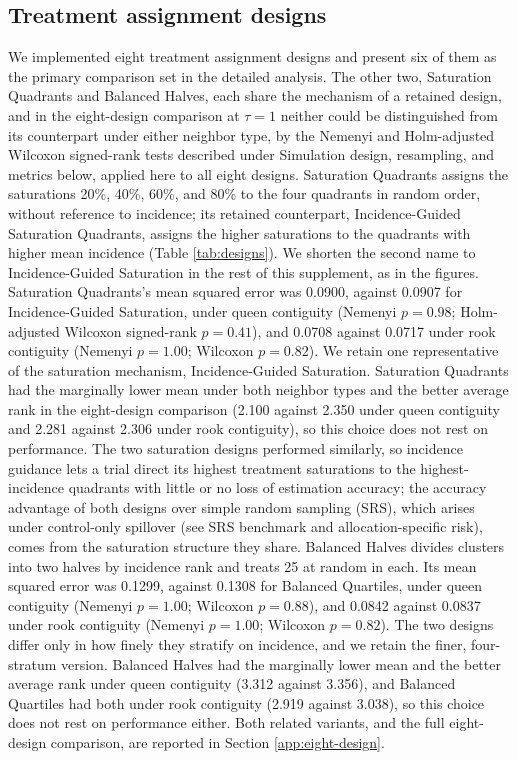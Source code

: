 \documentclass[11pt]{article}
\begin{document}
\subsection{Treatment assignment
designs}\label{treatment-assignment-designs}

We implemented eight treatment assignment designs and present six of
them as the primary comparison set in the detailed analysis. The other two, Saturation Quadrants and Balanced Halves, each share the mechanism
of a retained design, and in the eight-design comparison at \(\tau = 1\)
neither could be distinguished from its counterpart under either
neighbor type, by the Nemenyi and Holm-adjusted Wilcoxon signed-rank
tests described under Simulation design, resampling, and metrics below,
applied here to all eight designs. Saturation Quadrants assigns the saturations 20\%, 40\%, 60\%, and 80\% to the four quadrants in random order, without reference to incidence; its retained counterpart, Incidence-Guided Saturation Quadrants, assigns the higher saturations to the quadrants with higher mean incidence (Table \ref{tab:designs}). We shorten the second name to Incidence-Guided Saturation in the rest of this supplement, as in the figures. Saturation Quadrants's mean squared error was 0.0900, against 0.0907 for Incidence-Guided Saturation, under
queen contiguity (Nemenyi \(p = 0.98\); Holm-adjusted Wilcoxon
signed-rank \(p = 0.41\)), and 0.0708 against 0.0717 under rook
contiguity (Nemenyi \(p = 1.00\); Wilcoxon \(p = 0.82\)). We retain one
representative of the saturation mechanism, Incidence-Guided Saturation. Saturation Quadrants had the marginally lower mean under both
neighbor types and the better average rank in the eight-design
comparison (2.100 against 2.350 under queen contiguity and 2.281 against
2.306 under rook contiguity), so this choice does not rest on performance. The two saturation designs performed similarly, so incidence guidance lets a trial direct its highest treatment saturations to the highest-incidence quadrants with little or no loss of estimation accuracy; the accuracy advantage of both designs over simple random sampling (SRS), which arises under control-only spillover (see SRS benchmark and allocation-specific risk), comes from the saturation structure they share.
Balanced Halves divides clusters into two halves by incidence rank and
treats 25 at random in each. Its mean squared error was 0.1299, against
0.1308 for Balanced Quartiles, under queen contiguity (Nemenyi
\(p = 1.00\); Wilcoxon \(p = 0.88\)), and 0.0842 against 0.0837 under
rook contiguity (Nemenyi \(p = 1.00\); Wilcoxon \(p = 0.82\)). The two
designs differ only in how finely they stratify on incidence, and we
retain the finer, four-stratum version. Balanced Halves had the
marginally lower mean and the better average rank under queen contiguity
(3.312 against 3.356), and Balanced Quartiles had both under rook
contiguity (2.919 against 3.038), so this choice does not rest on
performance either. Both related variants, and the full eight-design
comparison, are reported in Section \ref{app:eight-design}.
\end{document}
